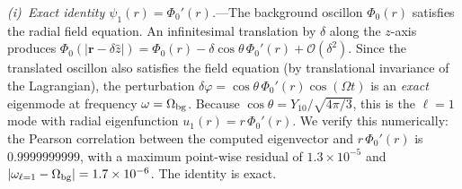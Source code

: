 \documentclass[aps,prd,onecolumn,superscriptaddress,nofootinbib,showpacs,12pt,notitlepage]{revtex4-2}
\renewcommand{\order}[1]{\mathcal{O}\!\left(#1\right)}
\begin{document}
\textit{(i)~Exact identity $\psi_1(r) = \Phi_0'(r)$.}---The
background oscillon $\Phi_0(r)$ satisfies the radial field
equation.  An infinitesimal translation by $\delta$ along the
$z$-axis produces
$\Phi_0(|\mathbf{r} - \delta\hat{z}|)
= \Phi_0(r) - \delta\cos\theta\,\Phi_0'(r) + \order{\delta^2}$.
Since the translated oscillon also satisfies the field equation
(by translational invariance of the Lagrangian), the perturbation
$\delta\varphi = \cos\theta\,\Phi_0'(r)\cos(\Omega t)$ is an
\emph{exact} eigenmode at frequency $\omega = \Omega_{\rm bg}$.
Because $\cos\theta = Y_{10}/\sqrt{4\pi/3}$, this is the
$\ell = 1$ mode with radial eigenfunction
$u_1(r) = r\,\Phi_0'(r)$.  We verify this numerically: the
Pearson correlation between the computed eigenvector and
$r\,\Phi_0'(r)$ is $0.9999999999$, with a maximum point-wise
residual of $1.3 \times 10^{-5}$ and
$|\omega_{\ell=1} - \Omega_{\rm bg}| = 1.7 \times 10^{-6}$.
The identity is exact.
\end{document}
